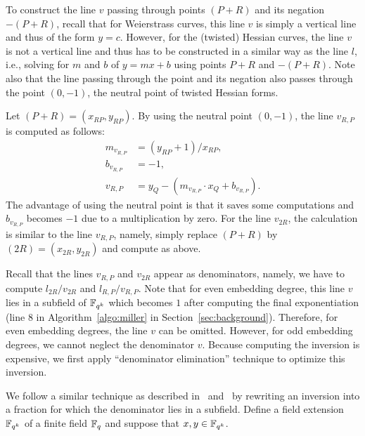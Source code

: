 To construct the line $v$ passing through points $(P+R)$ and its negation $-(P+R)$,
recall that for Weierstrass curves,
this line $v$ is simply a vertical line
and thus of the form $y = c$.
However, for the (twisted) Hessian curves, the line $v$ is not a vertical line
and thus has to be constructed in a similar way as the line $l$,
i.e., solving for $m$ and $b$ of $y = mx + b$ using points $P+R$ and $-(P+R)$.
Note also that the line passing through the point and its negation also passes through
the point $(0,-1)$, the neutral point of twisted Hessian forms.

Let $(P+R) = (x_{RP},y_{RP})$.
By using the neutral point $(0,-1)$,
the line $v_{R,P}$ is computed as follows:
\begin{align*}
m_{v_{R,P}} &= (y_{RP} + 1) / x_{RP},	\\
b_{v_{R,P}} &= -1,			\\
v_{R,P} &= y_Q - (m_{v_{R,P}} \cdot x_Q + b_{v_{R,P}}).
\end{align*}
The advantage of using the neutral point is that
it saves some computations and $b_{v_{R,P}}$ becomes $-1$
due to a multiplication by zero.
For the line $v_{2R}$,
the calculation is similar to the line $v_{R,P}$,
namely,
simply replace $(P+R)$ by $(2R) = (x_{2R}, y_{2R})$
and compute as above.

Recall that the lines $v_{R,P}$ and $v_{2R}$ appear as denominators,
namely, we have to compute $l_{2R}/v_{2R}$ and $l_{R,P}/v_{R,P}$.
Note that for even embedding degree,
this line $v$ lies in a subfield of $\mathbb{F}_{q^k}$
which becomes $1$ after computing the final exponentiation
({line 8} in Algorithm~\ref{algo:miller} in Section~\ref{sec:background}).
Therefore, for even embedding degrees, the line $v$ can be omitted.
However, for odd embedding degrees, we cannot neglect the denominator $v$.
Because computing the inversion is expensive,
we first apply ``denominator elimination'' technique to optimize this inversion.


We follow a similar technique as described in~\cite{2008/lin} and~\cite{2009/deg15}
by rewriting an inversion into a fraction for which the denominator lies in a subfield.
Define a field extension $\mathbb{F}_{q^k}$ of a finite field $\mathbb{F}_{q}$ and suppose that $x,y \in \mathbb{F}_{q^k}$.

